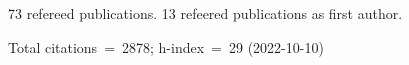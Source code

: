 73 refereed publications. 13 refeered publications as first author.

Total citations~=~2878; h-index~=~29 (2022-10-10)